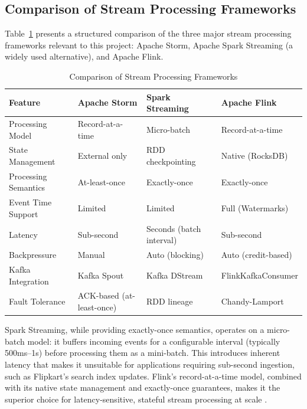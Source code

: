 \vspace{0.25cm}

\subsection{Comparison of Stream Processing Frameworks}
\begin{justify}
    Table~\ref{tab:framework_comparison} presents a structured comparison of the three major stream processing frameworks relevant to this project: Apache Storm, Apache Spark Streaming (a widely used alternative), and Apache Flink.

    \begin{table}[h]
        \centering
        \small
        \caption{Comparison of Stream Processing Frameworks}
        \renewcommand{\arraystretch}{1.5}
        \begin{tabular}{|p{3.5cm}|p{3cm}|p{3.5cm}|p{3.5cm}|}
            \hline
            \textbf{Feature} & \textbf{Apache Storm} & \textbf{Spark Streaming} & \textbf{Apache Flink} \\
            \hline
            Processing Model & Record-at-a-time & Micro-batch & Record-at-a-time \\
            \hline
            State Management & External only & RDD checkpointing & Native (RocksDB) \\
            \hline
            Processing Semantics & At-least-once & Exactly-once & Exactly-once \\
            \hline
            Event Time Support & Limited & Limited & Full (Watermarks) \\
            \hline
            Latency & Sub-second & Seconds (batch interval) & Sub-second \\
            \hline
            Backpressure & Manual & Auto (blocking) & Auto (credit-based) \\
            \hline
            Kafka Integration & Kafka Spout & Kafka DStream & FlinkKafkaConsumer \\
            \hline
            Fault Tolerance & ACK-based (at-least-once) & RDD lineage & Chandy-Lamport \\
            \hline
        \end{tabular}
        \label{tab:framework_comparison}
    \end{table}

    Spark Streaming, while providing exactly-once semantics, operates on a micro-batch model: it buffers incoming events for a configurable interval (typically 500ms--1s) before processing them as a mini-batch. This introduces inherent latency that makes it unsuitable for applications requiring sub-second ingestion, such as Flipkart's search index updates. Flink's record-at-a-time model, combined with its native state management and exactly-once guarantees, makes it the superior choice for latency-sensitive, stateful stream processing at scale \cite{[13]}.
\end{justify}

